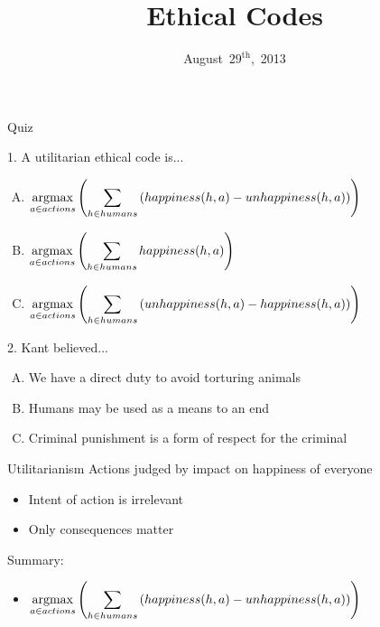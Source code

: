 \documentclass{beamer}
\title[Ethical Codes]{Ethical Codes}
\date{August~$29^{\text{th}}$,~2013}
\begin{document}
\begin{frame}
\titlepage
\end{frame}

\begin{frame}{Quiz}

\begin{block}{1. A utilitarian ethical code is...}
\begin{enumerate}[(A)]
\item<1-3> $\displaystyle \operatorname*{argmax}_{a \in actions} \left( \sum_{h \in humans} \left( happiness(h, a) - unhappiness(h, a)\right)\right)$
\item<1> $\displaystyle \operatorname*{argmax}_{a \in actions} \left( \sum_{h \in humans} happiness(h, a)\right)$
\item<1> $\displaystyle \operatorname*{argmax}_{a \in actions} \left( \sum_{h \in humans} \left( unhappiness(h, a) - happiness(h, a)\right)\right)$
\end{enumerate}
\end{block}
\begin{block}{2. Kant believed...}
\begin{enumerate}[(A)]
\item<1-2> We have a direct duty to avoid torturing animals
\item<1-2> Humans may be used as a means to an end
\item<1-3> Criminal punishment is a form of respect for the criminal
\end{enumerate}
\end{block}
\end{frame}

\begin{frame}{Utilitarianism}
Actions judged by impact on happiness of everyone
\begin{itemize}
\item Intent of action is irrelevant
\item Only consequences matter
\end{itemize}
\bigskip
Summary:
\begin{itemize}
\item $\displaystyle \operatorname*{argmax}_{a \in actions} \left( \sum_{h \in humans} \left( happiness(h, a) - unhappiness(h, a)\right)\right)$
\end{itemize}
\end{frame}
\end{document}
